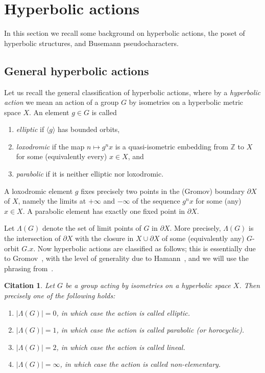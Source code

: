 \documentclass[10pt,a4paper]{article}
\theoremstyle{definition}
\theoremstyle{remark}
\newcommand{\Z}{\mathbb{Z}}
\theoremstyle{plain}
\newtheorem{cit}[cdrthm]{Citation}
\begin{document}
\section{Hyperbolic actions}\label{sec:actions}

In this section we recall some background on hyperbolic actions, the poset of hyperbolic structures, and Busemann pseudocharacters.


\subsection{General hyperbolic actions}\label{ssec:general_hyp_actions}

Let us recall the general classification of hyperbolic actions, where by a \emph{hyperbolic action} we mean an action of a group $G$ by isometries on a hyperbolic metric space $X$. An element $g\in G$ is called \begin{enumerate}
    \item \emph{elliptic} if $\langle g\rangle$ has bounded orbits, \item \emph{loxodromic} if the map $n\mapsto g^n x$ is a quasi-isometric embedding from $\Z$ to $X$ for some (equivalently every) $x\in X$, and 
    \item \emph{parabolic} if it is neither elliptic nor loxodromic. 
    \end{enumerate}
    A loxodromic element $g$ fixes precisely two points in the (Gromov) boundary $\partial X$ of $X$, namely the limits at $+\infty$ and $-\infty$ of the sequence $g^n x$ for some (any) $x\in X$. A parabolic element has exactly one fixed point in $\partial X$. 

Let $\Lambda(G)$ denote the set of limit points of $G$ in $\partial X$. More precisely, $\Lambda(G)$ is the intersection of $\partial X$ with the closure in $X\cup\partial X$ of some (equivalently any) $G$-orbit $G.x$. Now hyperbolic actions are classified as follows; this is essentially due to Gromov~\cite[Section~8.2]{gromov87}, with the level of generality due to Hamann~\cite{hamann17}, and we will use the phrasing from~\cite[Theorem~2.7]{confining}.

\begin{cit}
Let $G$ be a group acting by isometries on a hyperbolic space $X$. Then precisely one of the following holds:
\begin{enumerate}
    \item $|\Lambda(G)|=0$, in which case the action is called \emph{elliptic}.
    \item $|\Lambda(G)|=1$, in which case the action is called \emph{parabolic} (or \emph{horocyclic}).
    \item $|\Lambda(G)|=2$, in which case the action is called \emph{lineal}.
    \item $|\Lambda(G)|=\infty$, in which case the action is called \emph{non-elementary}.
\end{enumerate}
\end{cit}
\end{document}
